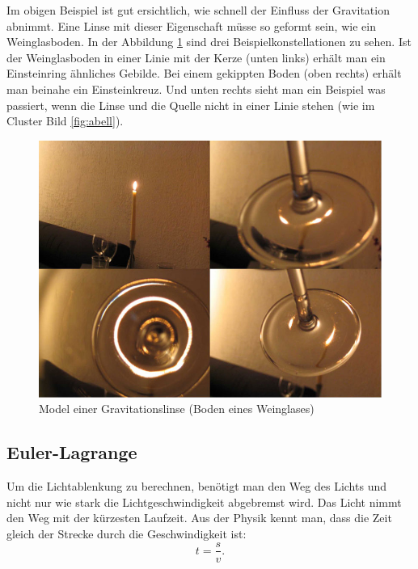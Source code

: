 \begin{refsection}
Im obigen Beispiel ist gut ersichtlich, wie schnell der Einfluss der
Gravitation abnimmt.  Eine Linse mit dieser Eigenschaft müsse so
geformt sein, wie ein Weinglasboden.  In der Abbildung
\ref{fig:ModelGravLinse} sind drei Beispielkonstellationen zu sehen.
Ist der Weinglasboden in einer Linie mit der Kerze (unten links)
erhält man ein Einsteinring ähnliches Gebilde.  Bei einem gekippten
Boden (oben rechts) erhält man beinahe ein Einsteinkreuz.  Und unten
%
rechts sieht man ein Beispiel was passiert, wenn die Linse und die
Quelle nicht in einer Linie stehen (wie im Cluster Bild
\ref{fig:abell}).

\begin{figure}
  \centering
  \includegraphics[width=\textwidth]{cluster/images/model_grav_lens}
  \caption{Model einer Gravitationslinse (Boden eines Weinglases)
    \cite{standford:ModelGravLens}}
  \label{fig:ModelGravLinse}
\end{figure}

\subsection{Euler-Lagrange}
%
Um die Lichtablenkung zu berechnen, benötigt man den Weg des Lichts
%
und nicht nur wie stark die Lichtgeschwindigkeit abgebremst wird.  Das
Licht nimmt den Weg mit der kürzesten Laufzeit.  Aus der Physik kennt
man, dass die Zeit gleich der Strecke durch die Geschwindigkeit ist:
\begin{equation*}
  t = \frac{s}{v}.
\end{equation*}


\end{refsection}
